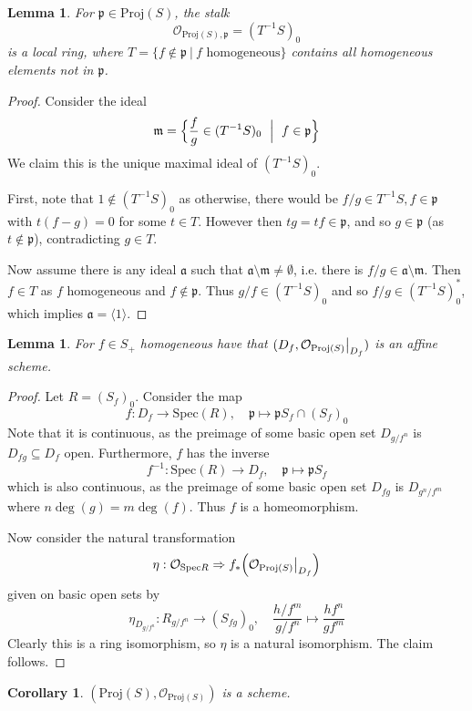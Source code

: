 \documentclass{scrartcl}
\newcommand{\p}{\mathfrak{p}}
\newcommand{\m}{\mathfrak{m}}
\renewcommand{\a}{\mathfrak{a}}
\renewcommand{\m}{\mathfrak{m}}
\newcommand{\Spec}{\mathrm{Spec}}
\newcommand{\Proj}{\mathrm{Proj}}
\renewcommand{\O}{\mathcal{O}}
\newcommand\restr[2]{{
    \left.\kern-\nulldelimiterspace
    #1
    \vphantom{\big|}
    \right|_{#2}
}}
\newtheorem{lemma}[prop]{Lemma}
\newtheorem{corollary}[prop]{Corollary}
\theoremstyle{definition}
\begin{document}
\begin{lemma}
    For $\p \in \Proj(S)$, the stalk
    \begin{equation*}
        \O_{\Proj(S), \p} = (T^{-1}S)_0
    \end{equation*}
    is a local ring, where $T = \{ f \notin \p \ | \ \text{$f$ homogeneous}\}$ contains all homogeneous elements not in $\p$.
\end{lemma}
\begin{proof}
    Consider the ideal
    \begin{equation*}
        \m = \Bigl\{ \frac f g \in (T^{-1}S)_0 \ \Bigm| \ f \in \p \Bigr\}
    \end{equation*}
    We claim this is the unique maximal ideal of $(T^{-1}S)_0$.

    First, note that $1 \notin (T^{-1}S)_0$ as otherwise, there would be $f/g \in T^{-1}S, f \in \p$ with $t(f - g) = 0$ for some $t \in T$.
    However then $tg = tf \in \p$, and so $g \in \p$ (as $t \notin \p$), contradicting $g \in T$.
    
    Now assume there is any ideal $\a$ such that $\a \setminus \m \neq \emptyset$, i.e. there is $f/g \in \a \setminus \m$.
    Then $f \in T$ as $f$ homogeneous and $f \notin \p$.
    Thus $g/f \in (T^{-1}S)_0$ and so $f/g \in (T^{-1}S)_0^*$, which implies $\a = \langle 1 \rangle$.
\end{proof}
\begin{lemma}
    For $f \in S_+$ homogeneous have that $(D_f, \restr{\O_{\Proj(S)}}{D_f})$ is an affine scheme.
\end{lemma}
\begin{proof}
    Let $R = (S_f)_0$.
    Consider the map
    \begin{equation*}
        f: D_f \to \Spec(R), \quad \p \mapsto \p S_f \cap (S_f)_0
    \end{equation*}
    Note that it is continuous, as the preimage of some basic open set $D_{g/f^n}$ is $D_{fg} \subseteq D_f$ open.
    Furthermore, $f$ has the inverse
    \begin{equation*}
        f^{-1}: \Spec(R) \to D_f, \quad \p \mapsto \p S_f
    \end{equation*}
    which is also continuous, as the preimage of some basic open set $D_{fg}$ is $D_{g^n/f^m}$ where $n\deg(g) = m\deg(f)$.
    Thus $f$ is a homeomorphism.

    Now consider the natural transformation
    \begin{equation*}
        \eta: \O_{\Spec R} \Rightarrow f_*\Bigl( \restr{\O_{\Proj(S)}}{D_f} \Bigr)
    \end{equation*}
    given on basic open sets by
    \begin{equation*}
        \eta_{D_{g/f^n}}: R_{g/f^n} \to (S_{fg})_0, \quad \frac {h/f^m} {g/f^n} \mapsto \frac {h f^n} {g f^m}
    \end{equation*}
    Clearly this is a ring isomorphism, so $\eta$ is a natural isomorphism.
    The claim follows.
\end{proof}
\begin{corollary}
    $(\Proj(S), \O_{\Proj(S)})$ is a scheme.
\end{corollary}

\printbibliography
\end{document}
